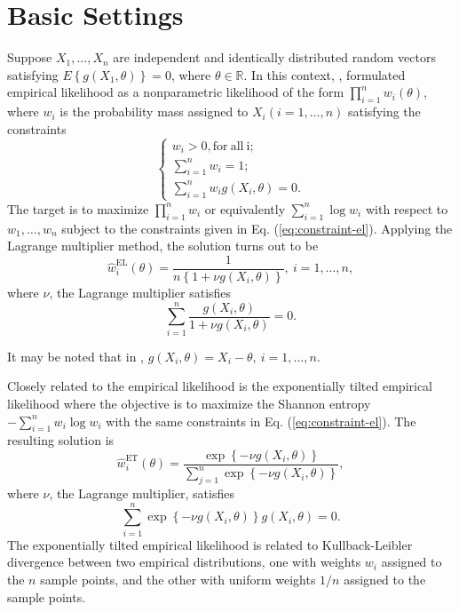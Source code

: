 \section{Basic Settings }

Suppose $X_{1},\ldots,X_{n}$ are independent and identically distributed
random  vectors satisfying $E\left\{ g\left(X_{1},\theta\right)\right\} =0$,
where $\theta\in\mathbb{R}$. In this context, \cite{owen1988empirical},
formulated empirical likelihood as a nonparametric likelihood of the
form $\prod_{i=1}^{n}w_{i}\left(\theta\right)$, where $w_{i}$ is
the probability mass assigned to $X_{i}\left(i=1,\ldots,n\right)$
satisfying the constraints 
\begin{equation}
\begin{cases}
w_{i}>0,\mathrm{for\: all\: i;}\\
\sum_{i=1}^{n}w_{i}=1;\\
\sum_{i=1}^{n}w_{i}g\left(X_{i},\theta\right)=0.
\end{cases}\label{eq:constraint-el}
\end{equation}
The target is to maximize $\prod_{i=1}^{n}w_{i}$ or equivalently
$\sum_{i=1}^{n}\log w_{i}$ with respect to $w_{1},\ldots,w_{n}$
subject to the constraints given in Eq. (\ref{eq:constraint-el}). Applying
the Lagrange multiplier method, the solution turns out to be 
\begin{equation}
\hat{w}_{i}^{\mathrm{EL}}\left(\theta\right)=\frac{1}{n\left\{ 1+\nu g\left(X_{i},\theta\right)\right\} },\: i=1,\ldots,n,\label{eq:sol-emp-lik}
\end{equation}
where $\nu$, the Lagrange multiplier satisfies 
\begin{equation}
\sum_{i=1}^{n}\frac{g\left(X_{i},\theta\right)}{1+\nu g\left(X_{i},\theta\right)}=0.\label{eq:lambda-eq}
\end{equation}


It may be noted that in  \cite{fang2005expected,fang2006empirical}%
{}, $g\left(X_{i},\theta\right)=X_{i}-\theta,\:i=1,\ldots,n$. 

Closely related to the empirical likelihood is the exponentially tilted
empirical likelihood where the objective is to maximize the Shannon
entropy $-\sum_{i=1}^{n}w_{i}\log w_{i}$ with the same constraints
in Eq. (\ref{eq:constraint-el}). The resulting solution is 
\[
\hat{w}_{i}^{\mathrm{ET}}\left(\theta\right)=\frac{\exp\left\{ -\nu g\left(X_{i},\theta\right)\right\} }{\sum_{j=1}^{n}\exp\left\{ -\nu g\left(X_{i},\theta\right)\right\} },
\]
where $\nu$, the Lagrange multiplier, satisfies 
\begin{equation}
\sum_{i=1}^{n}\exp\left\{ -\nu g\left(X_{i},\theta\right)\right\} g\left(X_{i},\theta\right)=0.\label{eq:lag-mul-exp-tilt-el}
\end{equation}
The exponentially tilted empirical likelihood is related to Kullback-Leibler
divergence between two empirical distributions, one with weights $w_{i}$
assigned to the $n$ sample points, and the other with uniform weights
$1/n$ assigned to the sample points. 

